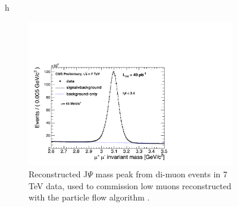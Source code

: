 \begin{figure}{h}
    \centering
    \begin{subfigure}[h]{0.40\textwidth}
        \includegraphics[width=\textwidth]{Figures/Reconstruction_Diagrams/MUO__JPsi40pb-1.pdf}
        \caption{Reconstructed J$\Psi$ mass peak from di-muon events
          in 7 TeV data, used to commission low \PT muons reconstructed
        with the particle flow algorithm \cite{CMS:Muon_particleFlow_commissioning}. }\label{fig:muon_jpsi_mass}
      \end{subfigure}
      ~ %
    \begin{subfigure}[h]{0.40\textwidth}

\end{subfigure}
\end{figure}
